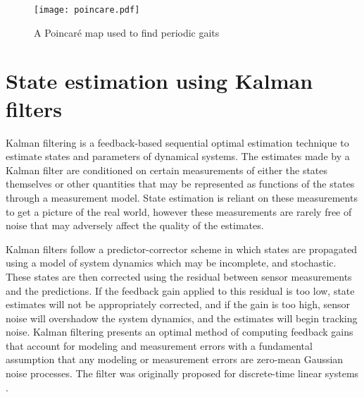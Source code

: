 \begin{figure}
	\centering
	\texttt{[image: poincare.pdf]}
	\caption{A Poincar\'e map used to find periodic gaits}\label{fig:poincare}
\end{figure}

\section{State estimation using Kalman filters}

Kalman filtering is a feedback-based sequential optimal estimation technique \cite{kalman1960new} to estimate states and parameters of dynamical systems. The estimates made by a Kalman filter are conditioned on certain measurements of either the states themselves or other quantities that may be represented as functions of the states through a measurement model. State estimation is reliant on these measurements to get a picture of the real world, however these measurements are rarely free of noise that may adversely affect the quality of the estimates. 

Kalman filters follow a predictor-corrector scheme in which states are propagated using a model of system dynamics which may be incomplete, and stochastic. These states are then corrected using the residual between sensor measurements and the predictions. If the feedback gain applied to this residual is too low, state estimates will not be appropriately corrected, and if the gain is too high, sensor noise will overshadow the system dynamics, and the estimates will begin tracking noise. Kalman filtering presents an optimal method of computing feedback gains that account for modeling and measurement errors with a fundamental assumption that any modeling or measurement errors are zero-mean Gaussian noise processes. The filter was originally proposed for discrete-time linear systems \cite{kalman1960new}. 
 
